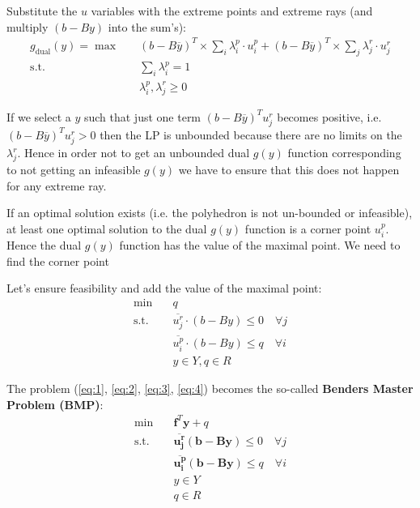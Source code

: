 \documentclass[fleqn,10pt]{wlscirep}
\begin{document}
Substitute the $u$ variables with the extreme points and extreme rays (and multiply $(b − By)$ into the sum’s):
\begin{align}
    g_{\text{dual}}(y) = \max \quad& ( b - B \overline { y } ) ^ { T } \times \sum _ { i } \lambda _ { i } ^ { p } \cdot u _ { i } ^ { p } + ( b - B \overline { y } ) ^ { T } \times \sum _ { j } \lambda _ { j } ^ { r } \cdot u _ { j } ^ { r } \\
    \text{s.t.} \quad& \sum _ { i } \lambda _ { i } ^ { p } = 1 \\ 
    & \lambda _ { i } ^ { p } , \lambda _ { j } ^ { r } \geq 0
\end{align}

If we select a $y$ such that just one term $(b - B\overline{y})^T u_j^r$ becomes positive, i.e. $(b - B\overline{y})^T u_j^r > 0$ then the LP is unbounded because there are no limits on the $\lambda_j^r$. Hence in order not to get an unbounded dual $g(y)$ function corresponding to not getting an infeasible $g(y)$ we have to ensure that this does not happen for any extreme ray.

If an optimal solution exists (i.e. the polyhedron is not un-bounded or infeasible), at least one optimal solution to the dual $g(y)$ function is a corner point $u_i^p$. Hence the dual $g(y)$ function has the value of the maximal point. We need to find the corner point 

Let’s ensure feasibility and add the value of the maximal point:
\begin{align}
    \min \quad& q \\
    \text{s.t.} \quad& \overline { u _ { j } ^ { r } } \cdot ( b - B y ) \leq 0 \quad \forall j \\ 
    & \overline { u _ { i } ^ { p } } \cdot ( b - B y ) \leq q \quad \forall i \\ 
    & y \in Y , q \in R
\end{align}

The problem (\ref{eq:1}, \ref{eq:2}, \ref{eq:3}, \ref{eq:4}) becomes the so-called \textbf{Benders Master Problem (BMP)}:
\begin{align}
    \min \quad& \mathbf{f}^{T} \mathbf{y} + q \\
    \text{s.t.} \quad& \mathbf{\overline {u_{j}^{r}}} (\mathbf{b} - \mathbf{B} \mathbf{y} ) \leq 0 \quad \forall j \\ 
    & \mathbf{\overline {u_{i}^{p}}} (\mathbf{b} - \mathbf{B} \mathbf{y} ) \leq q \quad \forall i \\ 
    & y \in Y \\
    & q \in R
\end{align}
\end{document}
